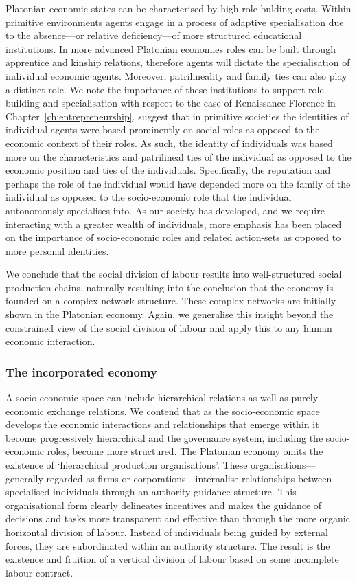 Platonian economic states can be characterised by high role-bulding costs. Within primitive environments agents engage in a process of adaptive specialisation due to the absence---or relative deficiency---of more structured educational institutions. In more advanced Platonian economies roles can be built through apprentice and kinship relations, therefore agents will dictate the specialisation of individual economic agents. Moreover, patrilineality and family ties can also play a distinct role. We note the importance of these institutions to support role-building and specialisation with respect to the case of Renaissance Florence in Chapter~\ref{ch:entrepreneurship}. \citet{NorthWallis2006} suggest that in primitive societies the identities of individual agents were based prominently on social roles as opposed to the economic context of their roles. As such, the identity of individuals was based more on the characteristics and patrilineal ties of the individual as opposed to the economic position and ties of the individuals. Specifically, the reputation and perhaps the role of the individual would have depended more on the family of the individual as opposed to the socio-economic role that the individual autonomously specialises into. As our society has developed, and we require interacting with a greater wealth of individuals, more emphasis has been placed on the importance of socio-economic roles and related action-sets as opposed to more personal identities.

We conclude that the social division of labour results into well-structured social production chains, naturally resulting into the conclusion that the economy is founded on a complex network structure. These complex networks are initially shown in the Platonian economy. Again, we generalise this insight beyond the constrained view of the social division of labour and apply this to any human economic interaction.

\subsubsection{The incorporated economy}

A socio-economic space can include hierarchical relations as well as purely economic exchange relations. We contend that as the socio-economic space develops the economic interactions and relationships that emerge within it become progressively hierarchical and the governance system, including the socio-economic roles, become more structured. The Platonian economy omits the existence of `hierarchical production organisations'. These organisations---generally regarded as firms or corporations---internalise relationships between specialised individuals through an authority guidance structure. This organisational form clearly delineates incentives and makes the guidance of decisions and tasks more transparent and effective than through the more organic horizontal division of labour. Instead of individuals being guided by external forces, they are subordinated within an authority structure. The result is the existence and fruition of a vertical division of labour based on some incomplete labour contract.

